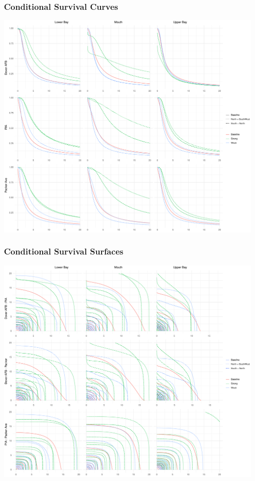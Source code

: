 \documentclass[aspectratio=169,10pt]{beamer}
\newlength{\frametextheight}
\begin{document}
\begin{frame}
    \frametitle{Conditional Survival Curves}
    \begin{center}
        \includegraphics[height=0.99\frametextheight]{./ch3/plots/condsurv_reg/condsurv_reg_1d_std}
    \end{center}
\end{frame}

\begin{frame}
    \frametitle{Conditional Survival Surfaces}
    \begin{center}
        \includegraphics[height=0.99\frametextheight]{./ch3/plots/condsurv_reg/condsurv_reg_2d_std}
    \end{center}
\end{frame}
\end{document}
